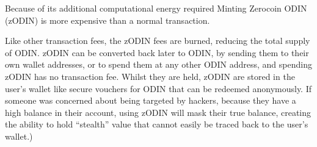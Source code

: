 Because of its additional computational energy required Minting Zerocoin ODIN (zODIN) is more expensive than a normal transaction.

Like other transaction fees, the zODIN fees are burned, reducing the total supply of ODIN. zODIN can be converted back later to ODIN, by sending them to their own wallet addresses, or to spend them at any other ODIN address, and spending zODIN has no transaction fee. Whilst they are held, zODIN are stored in the user's wallet like secure vouchers for ODIN that can be redeemed anonymously. If someone was concerned about being targeted by hackers, because they have a high balance in their account, using zODIN will mask their true balance, creating the ability to hold ``stealth'' value that cannot easily be traced back to the user's wallet.)

